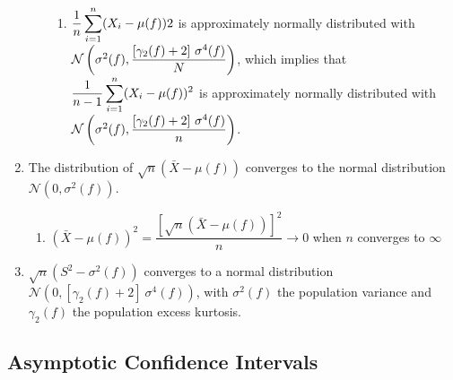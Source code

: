 \begin{enumerate}
\begin{enumerate}
\begin{enumerate}
            \item $\dfrac{1}{ n} \displaystyle\sum^n _{i=1}(X _i - \mu ( f ))2$ is approximately normally distributed with $\mathcal{N} \left(\sigma ^ 2( f ), \dfrac{[\gamma_2( f ) + 2]\ \sigma  ^4 ( f )}{N}\right)$,
            which implies that $\dfrac{1}{n-1} \displaystyle\sum^n _{i=1}(X_ i - \mu ( f ))^2$ is approximately normally distributed with
            \\[0.2cm]
            $\mathcal{N} \left(\sigma ^ 2( f ), \dfrac{[\gamma_2( f ) + 2]\ \sigma ^ 4( f )}{n}\right)$.
            \hfill \cite{statistics/book/Statistics-for-Data-Scientists/Maurits-Kaptein}
        \end{enumerate}
    \end{enumerate}

    \item The distribution of $\sqrt{n}( \bar{X} - \mu( f ))$ converges to the normal distribution $\mathcal{N} (0, \sigma ^2( f ))$.
    \hfill \cite{statistics/book/Statistics-for-Data-Scientists/Maurits-Kaptein}
    \begin{enumerate}
        \item
        $
            ( \bar{X} - \mu ( f ))^2
            = \dfrac{[\sqrt{n}( \bar{X} - \mu ( f ))]^2}{n} \to 0
        $
        when $n$ converges to $\infty$
        \hfill \cite{statistics/book/Statistics-for-Data-Scientists/Maurits-Kaptein}
    \end{enumerate}

    \item $\sqrt{n}(S^2 - \sigma  ^2( f ))$ converges to a normal distribution  $\mathcal{N} (0, [\gamma_2( f ) + 2]\ \sigma ^ 4( f ))$, with $\sigma ^ 2( f )$ the population variance and $\gamma_2( f )$ the population excess kurtosis.
    \hfill \cite{statistics/book/Statistics-for-Data-Scientists/Maurits-Kaptein}
\end{enumerate}








\subsection{Asymptotic Confidence Intervals}


